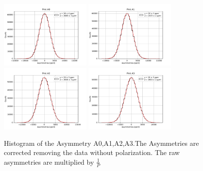 \begin{figure}[!ht]
\centering
\includegraphics[width = 0.40\textwidth]{Analysis/Histogram/A0.pdf} 
\includegraphics[width = 0.40\textwidth]{Analysis/Histogram/A1.pdf}\\
\includegraphics[width = 0.40\textwidth]{Analysis/Histogram/A2.pdf} 
\includegraphics[width = 0.40\textwidth]{Analysis/Histogram/A3.pdf}
\caption{Histogram of the Asymmetry A0,A1,A2,A3.The Asymmetries are corrected removing the data without polarization. The raw asymmetries are multiplied by $\frac{1}{P}$}
\label{fig:AsymmtriesA0A1A2A3}
\end{figure}

